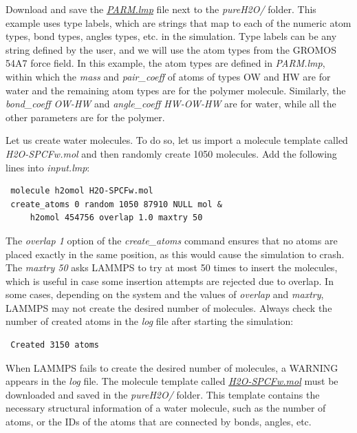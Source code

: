 \documentclass[9pt,tutorial]{livecoms}
\newcommand{\filepath}{https://raw.githubusercontent.com/lammpstutorials/lammpstutorials-article/main/files/}
\begin{document}
Download and save the
\href{\filepath tutorial3/PARM.lmp}{\textit{PARM.lmp}}
file next to the \textit{pureH2O/} folder. This example uses type labels, which
are strings that map to each of the numeric atom types, bond types, angles types,
etc. in the simulation. Type labels can be any string defined by the user, and we
will use the atom types from the GROMOS 54A7 force field. In this example, the atom
types are defined in \textit{PARM.lmp}, within which the \textit{mass}
and \textit{pair\_coeff} of atoms of types OW and HW are for water and the remaining
atom types are for the polymer molecule. Similarly, the \textit{bond\_coeff OW-HW}
and \textit{angle\_coeff HW-OW-HW} are for water, while all the other parameters
are for the polymer.

Let us create water molecules. To do so, let us import a molecule template called
\textit{H2O-SPCFw.mol} and then randomly create 1050 molecules. Add the following
lines into \textit{input.lmp}:
\begin{lstlisting}
 molecule h2omol H2O-SPCFw.mol
 create_atoms 0 random 1050 87910 NULL mol &
     h2omol 454756 overlap 1.0 maxtry 50
\end{lstlisting}
The \textit{overlap 1} option of the \textit{create\_atoms} command ensures
that no atoms are placed exactly in the same position, as this would cause the
simulation to crash. The \textit{maxtry 50} asks LAMMPS to try at most 50 times
to insert the molecules, which is useful in case some insertion attempts are
rejected due to overlap. In some cases, depending on the system and the values
of \textit{overlap} and \textit{maxtry}, LAMMPS may not create the desired number
of molecules. Always check the number of created atoms in the \textit{log} file
after starting the simulation:
\begin{lstlisting}
 Created 3150 atoms
\end{lstlisting}
When LAMMPS fails to create the desired number of molecules, a WARNING appears
in the \textit{log} file. The molecule template called
\href{\filepath tutorial3/pureH2O/H2O-SPCFw.mol}{\textit{H2O-SPCFw.mol}}
must be downloaded and saved in the \textit{pureH2O/} folder. This template contains
the necessary structural information of a water molecule, such as the number of
atoms, or the IDs of the atoms that are connected by bonds, angles, etc.
\end{document}
